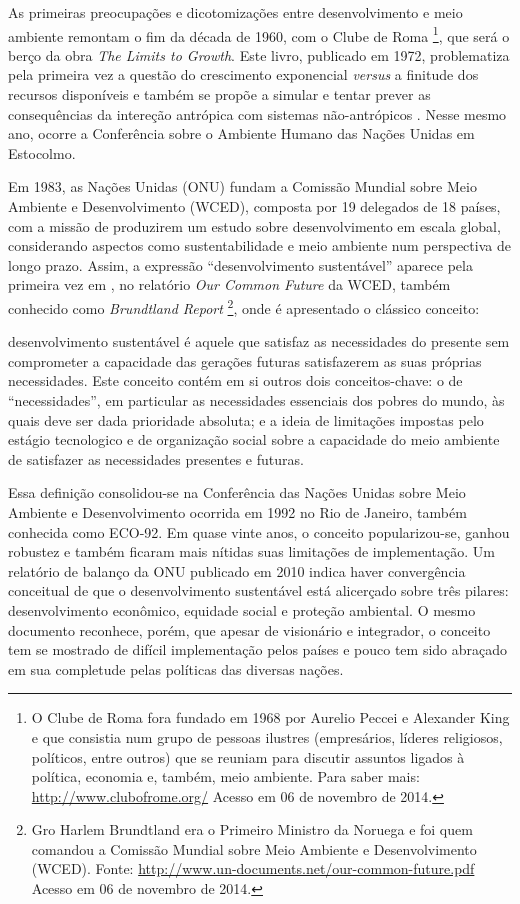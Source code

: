 As primeiras preocupações e dicotomizações entre desenvolvimento e meio ambiente remontam o fim da década de 1960, com o Clube de Roma
\footnote{O Clube de Roma fora fundado em 1968 por Aurelio Peccei e Alexander King e que consistia num grupo de pessoas ilustres (empresários, líderes religiosos, políticos, entre outros) que se reuniam para discutir assuntos ligados à política, economia e, também, meio ambiente. Para saber mais: \url{http://www.clubofrome.org/} Acesso em 06 de novembro de 2014.}, que será o berço da obra \emph{The Limits to Growth}. Este livro, publicado em 1972, problematiza pela primeira vez a questão do crescimento exponencial \emph{versus} a finitude dos recursos disponíveis e também se propõe a simular e tentar prever as consequências da intereção antrópica com sistemas não-antrópicos \cite{MEADOWS1972}. Nesse mesmo ano, ocorre a Conferência sobre o Ambiente Humano das Nações Unidas em Estocolmo.

Em 1983, as Nações Unidas (ONU) fundam a Comissão Mundial sobre Meio Ambiente e Desenvolvimento (WCED), composta por 19 delegados de 18 países, com a missão de produzirem um estudo sobre desenvolvimento em escala global, considerando aspectos como sustentabilidade e meio ambiente num perspectiva de longo prazo. Assim, a expressão ``desenvolvimento sustentável'' aparece pela primeira vez em \citeyear{WCED1987}, no relatório \emph{Our Common Future} da WCED, também conhecido como \emph{Brundtland Report} 
\footnote{Gro Harlem Brundtland era o Primeiro Ministro da Noruega e foi quem comandou a Comissão Mundial sobre Meio Ambiente e Desenvolvimento (WCED). Fonte: \url{http://www.un-documents.net/our-common-future.pdf} Acesso em 06 de novembro de 2014.}, onde é apresentado o clássico conceito:

\begin{citacao}
desenvolvimento sustentável é aquele que satisfaz as necessidades do presente sem comprometer a capacidade das gerações futuras satisfazerem as suas próprias necessidades. Este conceito contém em si outros dois conceitos-chave: o de ``necessidades'', em particular as necessidades essenciais dos pobres do mundo, às quais deve ser dada prioridade absoluta; e a ideia de limitações impostas pelo estágio tecnologico e de organização social sobre a capacidade do meio ambiente de satisfazer as necessidades presentes e futuras. 
\cite{WCED1987, p.41}
\end{citacao}   

Essa definição consolidou-se na Conferência das Nações Unidas sobre Meio Ambiente e Desenvolvimento ocorrida em 1992 no Rio de Janeiro, também conhecida como ECO-92. Em quase vinte anos, o conceito popularizou-se, ganhou robustez e também ficaram mais nítidas suas limitações de implementação. Um relatório de balanço da ONU publicado em 2010 \cite{ONU2010} indica haver convergência conceitual de que o desenvolvimento sustentável está alicerçado sobre três pilares: desenvolvimento econômico, equidade social e proteção ambiental. O mesmo documento reconhece, porém, que apesar de visionário e integrador, o conceito tem se mostrado de difícil implementação pelos países e pouco tem sido abraçado em sua completude pelas políticas das diversas nações. 

